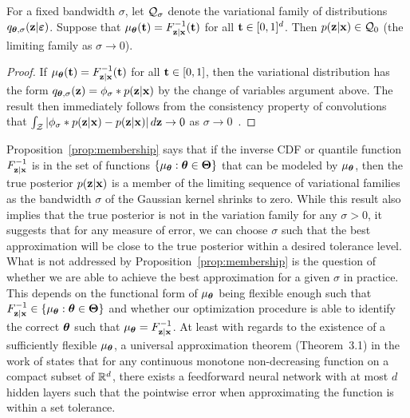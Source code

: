 \documentclass[10pt]{article}
\begin{document}
\begin{proposition} \label{prop:membership}
For a fixed bandwidth $\sigma$, let $\mathcal{Q}_\sigma$ denote the variational family of distributions $q_{{\bm{\theta}},\sigma}(\mathbf{z}|\bm{\varepsilon})$. Suppose that $\mu_{\bm{\theta}}(\mathbf{t})=F_{\mathbf{z}|\mathbf{x}}^{-1}(\mathbf{t})$ for all $\mathbf{t}\in[0,1]^d$. Then $p(\mathbf{z}|\mathbf{x})\in\mathcal{Q}_0$ (the limiting family as $\sigma\rightarrow0$).
\end{proposition}
\begin{proof}
If $\mu_{\bm{\theta}}(\mathbf{t})=F_{\mathbf{z}|\mathbf{x}}^{-1}(\mathbf{t})$ for all $\mathbf{t}\in[0,1]$, then the variational distribution has the form $q_{{\bm{\theta}},\sigma}(\mathbf{z}) = \phi_\sigma*p(\mathbf{z}|\mathbf{x})$ by the change of variables argument above. The result then immediately follows from the consistency property of convolutions that $\int_{\mathcal{Z}}\left|\phi_\sigma*p(\mathbf{z}|\mathbf{x}) - p(\mathbf{z}|\mathbf{x})\right|d\mathbf{z}\rightarrow0$ as $\sigma\rightarrow0$~\citep{Devroye:2001}.
\end{proof}

Proposition~\ref{prop:membership} says that if the inverse CDF or quantile function $F_{\mathbf{z}|\mathbf{x}}^{-1}$ is in the set of functions $\{\mu_{\bm{\theta}}:{\bm{\theta}}\in{\bm\Theta}\}$ that can be modeled by $\mu_{\bm{\theta}}$, then the true posterior $p(\mathbf{z}|\mathbf{x})$ is a member of the limiting sequence of variational families as the bandwidth $\sigma$ of the Gaussian kernel shrinks to zero. While this result also implies that the true posterior is not in the variation family for any $\sigma>0$, it suggests that for any measure of error, we can choose $\sigma$ such that the best approximation will be close to the true posterior within a desired tolerance level.
\\

What is not addressed by Proposition~\ref{prop:membership} is the question of whether we are able to achieve the best approximation for a given $\sigma$ in practice. This depends on the functional form of $\mu_{\bm{\theta}}$ being flexible enough such that $F_{\mathbf{z}|\mathbf{x}}^{-1}\in\{\mu_{\bm{\theta}}:{\bm{\theta}}\in{\bm\Theta}\}$ and whether our optimization procedure is able to identify the correct ${\bm{\theta}}$ such that $\mu_{\bm{\theta}}=F_{\mathbf{z}|\mathbf{x}}^{-1}$. At least with regards to the existence of a sufficiently flexible $\mu_{\bm{\theta}}$, a universal approximation theorem (Theorem~3.1) in the work of \citet{Daniels:2010} states that for any continuous monotone non-decreasing function on a compact subset of $\mathbb{R}^d$, there exists a feedforward neural network with at most $d$ hidden layers such that the pointwise error when approximating the function is within a set tolerance.
\\
\end{document}
